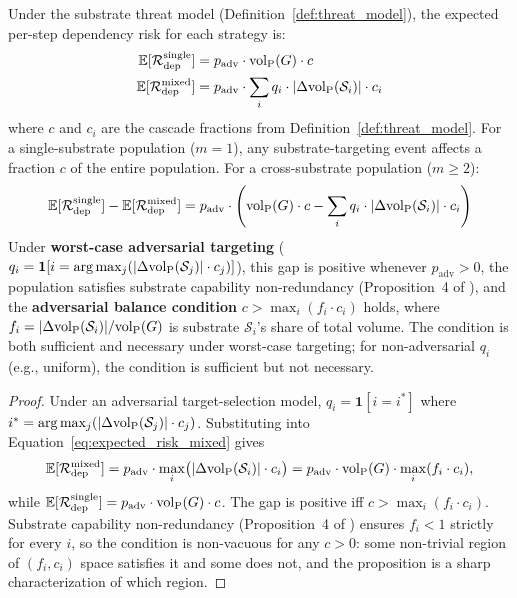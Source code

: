 \begin{proposition}
\label{prop:expected_risk}
Under the substrate threat model
    (Definition~\ref{def:threat_model}), the expected per-step dependency
    risk for each strategy is:
\begin{align}
\label{eq:expected_risk_single}
\mathbb{E}[\mathcal{R}_{\mathrm{dep}}^{\mathrm{single}}]
    &= p_{\mathrm{adv}} \cdot {\operatorname{vol}_{\mathrm{P}}}(G) \cdot c \\
\label{eq:expected_risk_mixed}
\mathbb{E}[\mathcal{R}_{\mathrm{dep}}^{\mathrm{mixed}}]
    &= p_{\mathrm{adv}} \cdot \sum_i q_i \cdot
    |\Delta {\operatorname{vol}_{\mathrm{P}}}(\mathcal{S}_i)| \cdot c_i
\end{align}
where $c$ and $c_i$ are the cascade fractions from
    Definition~\ref{def:threat_model}. For a single-substrate population
    ($m = 1$), any substrate-targeting event affects a fraction $c$ of
    the entire population. For a cross-substrate population
    ($m \geq 2$):
\begin{equation}
\label{eq:risk_gap}
\mathbb{E}[\mathcal{R}_{\mathrm{dep}}^{\mathrm{single}}] -
    \mathbb{E}[\mathcal{R}_{\mathrm{dep}}^{\mathrm{mixed}}]
    = p_{\mathrm{adv}} \cdot \left({\operatorname{vol}_{\mathrm{P}}}(G) \cdot c
    - \sum_i q_i \cdot |\Delta {\operatorname{vol}_{\mathrm{P}}}(\mathcal{S}_i)| \cdot c_i\right)
\end{equation}
Under \textbf{worst-case adversarial targeting}
    ($q_i = \mathbf{1}[i = \arg\max_j (|\Delta {\operatorname{vol}_{\mathrm{P}}}(\mathcal{S}_j)|
    \cdot c_j)]$), this gap is positive whenever $p_{\mathrm{adv}} > 0$,
    the population satisfies substrate capability non-redundancy
    (Proposition~4 of \citet{lasser2026horizon}), and the
    \textbf{adversarial balance condition}
    $c > \max_i (f_i \cdot c_i)$ holds, where
    $f_i = |\Delta {\operatorname{vol}_{\mathrm{P}}}(\mathcal{S}_i)| / {\operatorname{vol}_{\mathrm{P}}}(G)$ is substrate
    $\mathcal{S}_i$'s share of total volume. The condition is both
    sufficient and necessary under worst-case targeting; for
    non-adversarial $q_i$ (e.g., uniform), the condition is sufficient
    but not necessary.
\end{proposition}

\begin{proof}
Under an adversarial target-selection model, $q_i = \mathbf{1}[i = i^*]$
where $i^* = \arg\max_j (|\Delta {\operatorname{vol}_{\mathrm{P}}}(\mathcal{S}_j)| \cdot c_j)$.
Substituting into Equation~\eqref{eq:expected_risk_mixed} gives
\[
    \mathbb{E}[\mathcal{R}_{\mathrm{dep}}^{\mathrm{mixed}}]
    = p_{\mathrm{adv}} \cdot \max_i \bigl(|\Delta {\operatorname{vol}_{\mathrm{P}}}(\mathcal{S}_i)|
        \cdot c_i\bigr)
    = p_{\mathrm{adv}} \cdot {\operatorname{vol}_{\mathrm{P}}}(G) \cdot \max_i (f_i \cdot c_i),
\]
while $\mathbb{E}[\mathcal{R}_{\mathrm{dep}}^{\mathrm{single}}] =
p_{\mathrm{adv}} \cdot {\operatorname{vol}_{\mathrm{P}}}(G) \cdot c$. The gap is positive iff
$c > \max_i (f_i \cdot c_i)$. Substrate capability non-redundancy
(Proposition~4 of \citet{lasser2026horizon}) ensures $f_i < 1$ strictly
for every $i$, so the condition is non-vacuous for any $c > 0$: some
non-trivial region of $(f_i, c_i)$ space satisfies it and some does
not, and the proposition is a sharp characterization of which region.
\end{proof}

